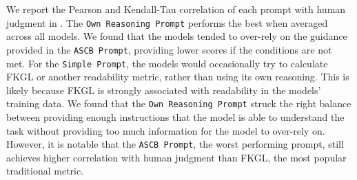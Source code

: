 

We report the Pearson and Kendall-Tau correlation of each prompt with human judgment in . The \texttt{Own Reasoning Prompt} performs the best when averaged across all models. We found that the models tended to over-rely on the guidance provided in the \texttt{ASCB Prompt}, providing lower scores if the conditions are not met. For the \texttt{Simple Prompt}, the models would occasionally try to calculate FKGL or another readability metric, rather than using its own reasoning. This is likely because FKGL is strongly associated with readability in the models' training data. We found that the \texttt{Own Reasoning Prompt} struck the right balance between providing enough instructions that the model is able to understand the task without providing too much information for the model to over-rely on. However, it is notable that the \texttt{ASCB Prompt}, the worst performing prompt, still achieves higher correlation with human judgment than FKGL, the most popular traditional metric. 




